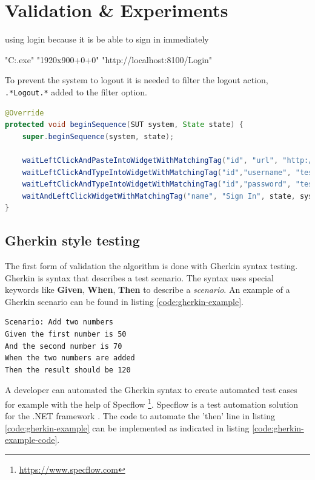 \chapter{Validation \& Experiments}


using login because it is be able to sign in immediately 
\begin{verbatim*}
"C:\tools\chromedriver.exe" "1920x900+0+0" "http://localhost:8100/Login"
\end{verbatim*}

To prevent the system to logout it is needed to filter the logout action, \verb|.*Logout.*| added to the filter option. 

\begin{lstlisting}[language=Java, caption=Begin Sequence code, label=code:beginSequence]
@Override
protected void beginSequence(SUT system, State state) {
	super.beginSequence(system, state);

	waitLeftClickAndPasteIntoWidgetWithMatchingTag("id", "url", "http://localhost:5000", state, system, 5,1.0);
	waitLeftClickAndTypeIntoWidgetWithMatchingTag("id","username", "testar2\\testar", state, system, 5,1.0);
	waitLeftClickAndTypeIntoWidgetWithMatchingTag("id","password", "testar", state, system, 5,1.0);
	waitAndLeftClickWidgetWithMatchingTag("name", "Sign In", state, system, 5, 1.0);
}
\end{lstlisting}

\newpage

\section{Gherkin style testing}
The first form of validation the algorithm is done with Gherkin syntax testing. Gherkin is syntax that describes a test scenario. The syntax uses special keywords like \textbf{Given}, \textbf{When}, \textbf{Then} to describe a \textit{scenario}. An example of a Gherkin scenario can be found in listing \ref{code:gherkin-example}.

\begin{lstlisting}[language=Gherkin, caption=Calculator test example, label=code:gherkin-example]
Scenario: Add two numbers
Given the first number is 50
And the second number is 70
When the two numbers are added
Then the result should be 120
\end{lstlisting}

A developer can automated the Gherkin syntax to create automated test cases for example with the help of Specflow \footnote{\url{https://www.specflow.com}}. Specflow is a test automation solution for the .NET framework \cite{specflow}. The code to automate the 'then' line in listing \ref{code:gherkin-example} can be implemented as indicated in listing \ref{code:gherkin-example-code}.

